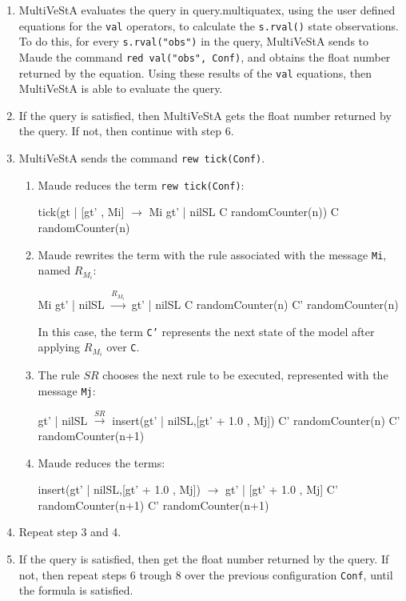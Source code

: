 \begin{enumerate}
\item MultiVeStA evaluates the query in query.multiquatex, using the user defined equations for the \texttt{val} operators, to calculate the \texttt{s.rval()} state observations. To do this, for every \texttt{s.rval("obs")} in the query, MultiVeStA sends to Maude the command \texttt{red val("obs", Conf)}, and obtains the float number returned by the equation. Using these results of the \texttt{val} equations, then MultiVeStA is able to evaluate the query.

\item If the query is satisfied, then MultiVeStA gets the float number returned by the query. If not, then continue with step 6.

\item MultiVeStA sends the command \texttt{rew tick(Conf)}.
    \begin{enumerate}
        \item Maude reduces the term \texttt{rew tick(Conf)}:
        \begin{maude}

tick({gt | [gt' , Mi]}     $\rightarrow$  Mi {gt' | nilSL }
     {C randomCounter(n)})    {C randomCounter(n)}\end{maude}
        \item Maude rewrites the term with the rule associated with the message \texttt{Mi}, named $R_{M_i}$:
        \begin{maude}
        
Mi {gt' | nilSL}    $\xrightarrow{R_{M_i}}$ {gt' | nilSL }
{C randomCounter(n)}     {C'  randomCounter(n)}
        \end{maude}
        In this case, the term \texttt{C'} represents the next state of the model after applying $R_{M_i}$ over \texttt{C}.
        \item The rule $SR$ chooses the next rule to be executed, represented with the message \texttt{Mj}:
        \begin{maude}

{gt' | nilSL }        $\xrightarrow{SR}$   insert({gt' | nilSL},[gt' + 1.0 , Mj])
{C' randomCounter(n)}       {C' randomCounter(n+1)}\end{maude}
        
        \item Maude reduces the terms:
        \begin{maude}
        
insert({gt' | nilSL},[gt' + 1.0 , Mj]) $\rightarrow$ {gt' | [gt' + 1.0 , Mj]} 
{C' randomCounter(n+1)}                   {C' randomCounter(n+1)}\end{maude}
    \end{enumerate}

    \item Repeat step 3 and 4.
    
    \item If the query is satisfied, then get the float number returned by the query. If not, then repeat steps 6 trough 8 over the previous configuration \texttt{Conf}, until the formula is satisfied.
\end{enumerate}
